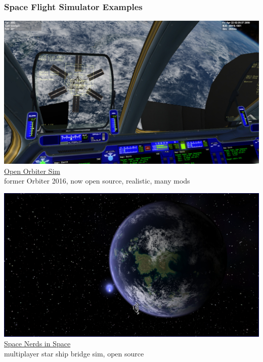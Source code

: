 \documentclass[aspectratio=169,11pt,xcolor=dvipsnames]{beamer}
\begin{document}
\begin{frame}
  \frametitle{Space Flight Simulator Examples}
  \begin{minipage}[t]{0.49\textwidth}
    \begin{center}
      \includegraphics[width=\textwidth]{orbiter}\\
      \href{https://openorbiter.space/}{Open Orbiter Sim}\\
      former Orbiter 2016, now open source, realistic, many mods
    \end{center}
  \end{minipage}
  \begin{minipage}[t]{0.49\textwidth}
    \begin{center}
      \includegraphics[width=\textwidth]{nerds}\\
      \href{https://smcameron.github.io/space-nerds-in-space/}{Space Nerds in Space}\\
      multiplayer star ship bridge sim, open source
    \end{center}
  \end{minipage}
\end{frame}
\end{document}
